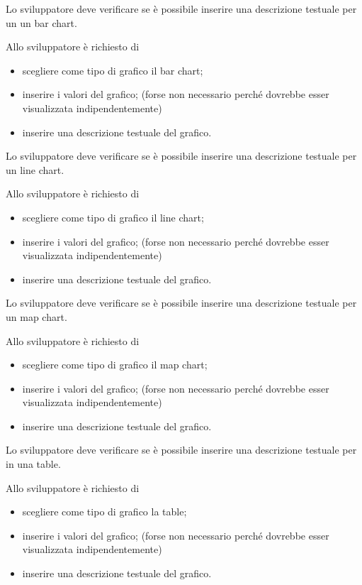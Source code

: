 	Lo sviluppatore deve verificare se è possibile inserire una descrizione testuale per un un bar chart.

		Allo sviluppatore è richiesto di
		\begin{itemize}
			\item scegliere come tipo di grafico il bar chart;
			\item inserire i valori del grafico; (forse non necessario perché dovrebbe esser visualizzata indipendentemente)
			\item inserire una descrizione testuale del grafico.
		\end{itemize}

	Lo sviluppatore deve verificare se è possibile inserire una descrizione testuale per un line chart.

		Allo sviluppatore è richiesto di
		\begin{itemize}
			\item scegliere come tipo di grafico il line chart;
			\item inserire i valori del grafico; (forse non necessario perché dovrebbe esser visualizzata indipendentemente)
			\item inserire una descrizione testuale del grafico.
		\end{itemize}

	Lo sviluppatore deve verificare se è possibile inserire una descrizione testuale per un map chart.

		Allo sviluppatore è richiesto di
		\begin{itemize}
			\item scegliere come tipo di grafico il map chart;
			\item inserire i valori del grafico; (forse non necessario perché dovrebbe esser visualizzata indipendentemente)
			\item inserire una descrizione testuale del grafico.
		\end{itemize}

	Lo sviluppatore deve verificare se è possibile inserire una descrizione testuale per in una table.

		Allo sviluppatore è richiesto di
		\begin{itemize}
			\item scegliere come tipo di grafico la table;
			\item inserire i valori del grafico; (forse non necessario perché dovrebbe esser visualizzata indipendentemente)
			\item inserire una descrizione testuale del grafico.
		\end{itemize}

